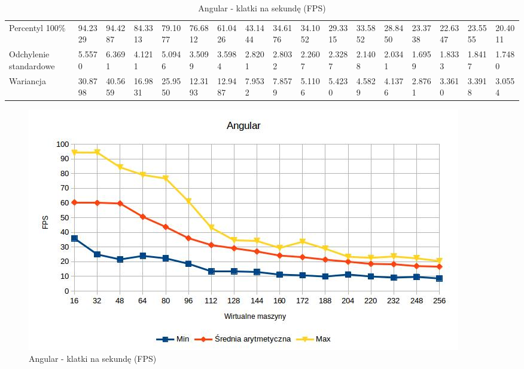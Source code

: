 \documentclass[polish, twoside, 12pt]{mwart}
\begin{document}
\begin{table}[]
{\begin{tabular}{lllllllllllllllll}
  Percentyl 100\%        & 94.2329 & 94.4287 & 84.3313 & 79.1077 & 76.6812 & 61.0426 & 43.1444 & 34.6176 & 34.1052 & 29.3315 & 33.5852 & 28.8450 & 23.3738 & 22.6347 & 23.5555 & 20.4011 \\
  Odchylenie standardowe & 5.5570  & 6.3691  & 4.1211  & 5.0946  & 3.5099  & 3.5984  & 2.8201  & 2.8032  & 2.2607  & 2.3287  & 2.1408  & 2.0341  & 1.6959  & 1.8333  & 1.8417  & 1.7480  \\
  Wariancja              & 30.8798 & 40.5659 & 16.9831 & 25.9550 & 12.3193 & 12.9487 & 7.9532  & 7.8579  & 5.1106  & 5.4230  & 4.5829  & 4.1376  & 2.8761  & 3.3610  & 3.3918  & 3.0554 
  \end{tabular}%
  }
  \caption{Angular - klatki na sekundę (FPS)}
\end{table}

\begin{figure}[ht]
  \includegraphics[width=\textwidth]{angular-fps.jpg}
	\caption{Angular - klatki na sekundę (FPS)}
\end{figure}
\end{document}
